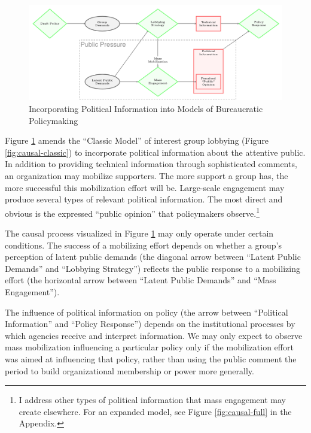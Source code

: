 \documentclass[
      12pt,
        ]{article}
\begin{document}
\begin{figure}

{\centering \includegraphics[width=6.5in]{../Figs/causal-whymail} 

}

\caption{Incorporating Political Information into Models of Bureaucratic Policymaking}\label{fig:causal-whymail}
\end{figure}

Figure \ref{fig:causal-whymail} amends the ``Classic Model'' of interest
group lobbying (Figure \ref{fig:causal-classic}) to incorporate political information about the attentive public. In addition to providing technical information through sophisticated comments, an organization may mobilize supporters.
The more support a group has, the more successful this mobilization effort will be.
Large-scale engagement may produce several types of relevant political
information. The most direct and obvious is the expressed ``public
opinion'' that policymakers observe.\footnote{I address other types of political information that mass engagement may create elsewhere. For an expanded model, see Figure
  \ref{fig:causal-full} in the Appendix.}

The causal process visualized in Figure
\ref{fig:causal-whymail} may only operate under certain conditions. The success of a mobilizing effort depends on whether a group's perception of latent public demands (the diagonal arrow between ``Latent Public Demands'' and ``Lobbying Strategy'') reflects the public response to a mobilizing effort (the horizontal arrow between ``Latent Public Demands'' and ``Mass Engagement'').

The influence of political information on policy (the arrow between ``Political Information'' and ``Policy Response'') depends on the institutional processes by which agencies receive and interpret information. We may only expect to observe mass mobilization influencing a particular policy only if the mobilization effort was aimed at influencing that policy, rather than using the public comment the period to build organizational membership or power more generally.
\end{document}
